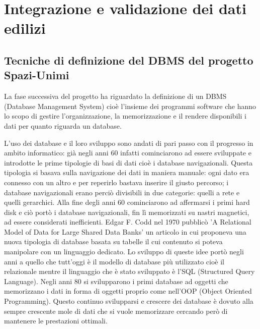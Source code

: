 \documentclass[12pt]{report}
\begin{document}
\vspace{5mm} %


\chapter{Integrazione e validazione dei dati edilizi}
\label{Data-Integration}

\section{Tecniche di definizione del DBMS del progetto Spazi-Unimi}

La fase successiva del progetto ha riguardato la definizione di un DBMS (Database Management System) cioè l'insieme dei programmi software che hanno lo scopo di gestire l'organizzazione, la memorizzazione e il rendere disponibili i dati per quanto riguarda un database.

\vspace{5mm} %

L'uso dei database e il loro sviluppo sono andati di pari passo con il progresso in ambito informatico: già negli anni 60 infatti cominciarono ad essere sviluppate e introdotte le prime tipologie di basi di dati cioè i database navigazionali. 
Questa tipologia si basava sulla navigazione dei dati in maniera manuale: ogni dato era connesso con un altro e per reperirlo bastava inserire il giusto percorso; i database navigazionali erano perciò divisibili in due categorie: quelli a rete e quelli gerarchici.
Alla fine degli anni 60 cominciarono ad affermarsi i primi hard disk e ciò portò i database navigazionali, fin lì memorizzati su nastri magnetici, ad essere considerati inefficienti. 
Edgar F. Codd nel 1970 pubblicò 'A Relational Model of Data for Large Shared Data Banks'\cite{Codd} un articolo in cui proponeva una nuova tipologia di database basata su tabelle il cui contenuto si poteva manipolare con un linguaggio dedicato.
Lo sviluppo di queste idee portò negli anni a quello che tutt'oggi è il modello di database più utilizzato cioè il relazionale mentre il linguaggio che è stato sviluppato è l'SQL (Structured Query Language).
Negli anni 80 si svilupparono i primi database ad oggetti che memorizzano i dati in forma di oggetti proprio come nell'OOP (Object Oriented Programming).
Questo continuo svilupparsi e crescere dei database è dovuto alla sempre crescente mole di dati che si vuole memorizzare cercando però di mantenere le prestazioni ottimali. 
\end{document}
